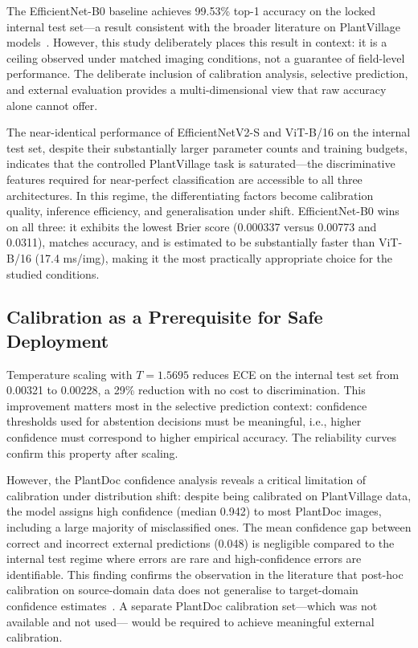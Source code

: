 \documentclass[conference]{IEEEtran}
\begin{document}
The EfficientNet-B0 baseline achieves 99.53\% top-1 accuracy on the locked
internal test set---a result consistent with the broader literature on PlantVillage
models~\cite{mohanty2016deep,too2019comparative,ferentinos2018deep}. However,
this study deliberately places this result in context: it is a ceiling observed
under matched imaging conditions, not a guarantee of field-level performance.
The deliberate inclusion of calibration analysis, selective prediction, and
external evaluation provides a multi-dimensional view that raw accuracy alone
cannot offer.

The near-identical performance of EfficientNetV2-S and ViT-B/16 on the internal
test set, despite their substantially larger parameter counts and training
budgets, indicates that the controlled PlantVillage task is saturated---the
discriminative features required for near-perfect classification are accessible
to all three architectures. In this regime, the differentiating factors become
calibration quality, inference efficiency, and generalisation under shift.
EfficientNet-B0 wins on all three: it exhibits the lowest Brier score
(0.000337 versus 0.00773 and 0.0311), matches accuracy, and is estimated to
be substantially faster than ViT-B/16 (17.4 ms/img), making it the most
practically appropriate choice for the studied conditions.

\subsection{Calibration as a Prerequisite for Safe Deployment}

Temperature scaling with $T=1.5695$ reduces ECE on the internal test set from
0.00321 to 0.00228, a 29\% reduction with no cost to discrimination. This
improvement matters most in the selective prediction context: confidence
thresholds used for abstention decisions must be meaningful, i.e., higher
confidence must correspond to higher empirical accuracy. The reliability curves
confirm this property after scaling.

However, the PlantDoc confidence analysis reveals a critical limitation of
calibration under distribution shift: despite being calibrated on PlantVillage
data, the model assigns high confidence (median 0.942) to most PlantDoc images,
including a large majority of misclassified ones. The mean confidence gap between
correct and incorrect external predictions (0.048) is negligible compared to
the internal test regime where errors are rare and high-confidence errors are
identifiable. This finding confirms the observation in the literature that
post-hoc calibration on source-domain data does not generalise to
target-domain confidence estimates~\cite{ovadia2019can,guo2017calibration}.
A separate PlantDoc calibration set---which was not available and not used---
would be required to achieve meaningful external calibration.
\end{document}
